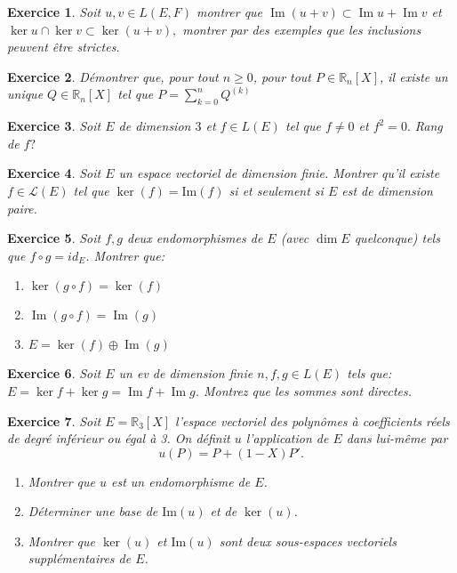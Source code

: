 \documentclass[12pt,a4paper]{article}
\DeclareMathOperator{\Ima }{Im}
\theoremstyle{break}
\theoremstyle{break}
\newtheorem{Exo}{Exercice}
\begin{document}
\begin{Exo}
	Soit $u,v\in L\left( E,F\right) $ montrer que $\Ima \left(u+v\right) \subset \Ima  u+\Ima  v$ et $\ker u\cap \ker v\subset \ker \left( u+v\right) ,$ montrer par des exemples que les inclusions peuvent être strictes.
\end{Exo}




\begin{Exo}
	Démontrer que, pour tout $n\geq 0$, pour tout $P\in\mathbb R_n[X]$, il existe un unique $Q\in\mathbb R_n[X]$ tel que $P=\sum_{k=0}^n Q^{(k)}$
\end{Exo}


\begin{Exo}
	Soit $E$ de dimension $3$ et $f\in L\left( E\right) $ tel que $f\neq 0$
	et $f^{2}=0.$ Rang de $f?$
	
\end{Exo}

\begin{Exo}
	Soit $E$ un espace vectoriel de dimension finie.
	Montrer qu'il existe $f\in\mathcal L(E)$ tel que $\ker(f)=\textrm{Im}(f)$
	si et seulement si $E$ est de dimension paire.
\end{Exo}

\newpage
\begin{Exo}
	Soit $f,g$ deux endomorphismes de $E$ (avec $\dim E$ quelconque) tels que $f\circ g=id_E$. Montrer que:
	\begin{multicols}{3}
		\begin{enumerate}
			\item
			$\ker(g\circ f)=\ker(f)$
			\item
			$\Ima (g\circ f)=\Ima (g)$
			\item
			$E=\ker(f)\oplus \Ima(g)$
		\end{enumerate}
	\end{multicols}
\end{Exo}

\begin{Exo}
	Soit $E$ un ev de dimension finie $n,f,g\in L\left( E\right) $ tels que: $E=\ker f+\ker g=\Ima  f+\Ima g$. Montrez que les sommes sont directes.
\end{Exo}
\begin{Exo}
	Soit $E=\mathbb R_3[X]$ l'espace vectoriel des polynômes à coefficients réels de degré inférieur ou égal à 3.
	On définit $u$ l'application de $E$ dans lui-même par
	$$u(P)=P+(1-X)P'.$$
	\begin{enumerate}
		\item Montrer que $u$ est un endomorphisme de $E$.
		\item Déterminer une base de $\textrm{Im}(u)$ et de $\ker(u)$.
		\item Montrer que $\ker(u)$ et $\textrm{Im}(u)$ sont deux sous-espaces
		vectoriels supplémentaires de $E$.
	\end{enumerate}
\end{Exo}
\end{document}
